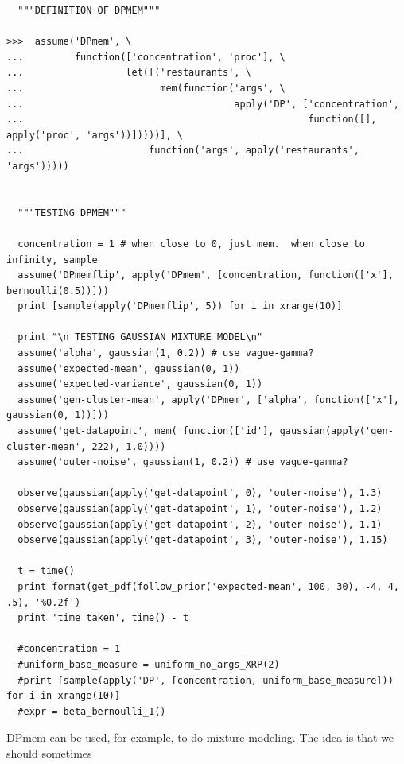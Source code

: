 \documentclass[11pt]{article}
\begin{document}
\begin{small}
\begin{verbatim}
  """DEFINITION OF DPMEM"""

>>>  assume('DPmem', \
...         function(['concentration', 'proc'], \
...                  let([('restaurants', \
...                        mem(function('args', \
...                                     apply('DP', ['concentration', 
...                                                  function([], apply('proc', 'args'))]))))], \
...                      function('args', apply('restaurants', 'args'))))) 


  """TESTING DPMEM"""

  concentration = 1 # when close to 0, just mem.  when close to infinity, sample 
  assume('DPmemflip', apply('DPmem', [concentration, function(['x'], bernoulli(0.5))]))
  print [sample(apply('DPmemflip', 5)) for i in xrange(10)]

  print "\n TESTING GAUSSIAN MIXTURE MODEL\n"
  assume('alpha', gaussian(1, 0.2)) # use vague-gamma? 
  assume('expected-mean', gaussian(0, 1)) 
  assume('expected-variance', gaussian(0, 1)) 
  assume('gen-cluster-mean', apply('DPmem', ['alpha', function(['x'], gaussian(0, 1))]))
  assume('get-datapoint', mem( function(['id'], gaussian(apply('gen-cluster-mean', 222), 1.0))))
  assume('outer-noise', gaussian(1, 0.2)) # use vague-gamma?

  observe(gaussian(apply('get-datapoint', 0), 'outer-noise'), 1.3)
  observe(gaussian(apply('get-datapoint', 1), 'outer-noise'), 1.2)
  observe(gaussian(apply('get-datapoint', 2), 'outer-noise'), 1.1)
  observe(gaussian(apply('get-datapoint', 3), 'outer-noise'), 1.15)

  t = time()
  print format(get_pdf(follow_prior('expected-mean', 100, 30), -4, 4, .5), '%0.2f')
  print 'time taken', time() - t

  #concentration = 1
  #uniform_base_measure = uniform_no_args_XRP(2)
  #print [sample(apply('DP', [concentration, uniform_base_measure])) for i in xrange(10)]
  #expr = beta_bernoulli_1()

\end{verbatim}
\end{small}


DPmem can be used, for example, to do mixture modeling.  The idea is that we should sometimes


\pagebreak

\begin{thebibliography}{99}



\end{thebibliography}
\end{document}
